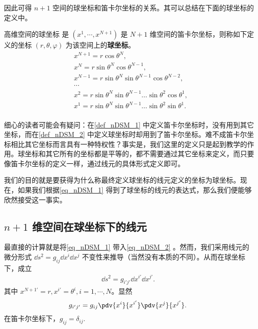 因此可得 $n+1$ 空间的球坐标和笛卡尔坐标的关系。其可以总结在下面的球坐标的定义中。
\begin{definition}{高维空间的球坐标}\label{def_nDSM_2}
是 $(x^1,\cdots,x^{N+1})$ 是 $N+1$ 维空间的笛卡尔坐标，则称如下定义的坐标 $(r,\theta,\varphi)$ 为该空间上的\textbf{球坐标}。
\begin{equation}\label{eq_nDSM_1}
\begin{aligned}
&x^{N+1}=r\cos \theta^N,\\
&x^{N}=r\sin \theta^N\cos\theta^{N-1},\\
&x^{N-1}=r\sin \theta^N\sin\theta^{N-1}\cos\theta^{N-2},\\
&\cdots\\
&x^{2}=r\sin \theta^N\sin\theta^{N-1}\ldots\sin\theta^2\cos\theta^1,\\
&x^{1}=r\sin \theta^N\sin\theta^{N-1}\ldots\sin\theta^2\sin\theta^1.\\
\end{aligned}~
\end{equation}
\end{definition}

细心的读者可能会有疑问：在\autoref{def_nDSM_1} 中定义笛卡尔坐标时，没有用到其它坐标，而在\autoref{def_nDSM_2} 中定义球坐标时却用到了笛卡尔坐标。难不成笛卡尔坐标相比其它坐标而言具有一种特权性？事实是，我们这里的定义只是起到教学的作用。球坐标和其它所有的坐标都是平等的，都不需要通过其它坐标来定义，而只要像笛卡尔坐标的定义一样，通过线元的具体形式定义即可。

我们的目的就是要获得为什么称最终定义球坐标的线元定义的坐标为球坐标。现在，如果我们根据\autoref{eq_nDSM_1} 得到了球坐标的线元的表达式，那么我们便能够欣然接受这一事实。

\subsection{$n+1$ 维空间在球坐标下的线元}
最直接的计算就是将\autoref{eq_nDSM_1} 带入\autoref{eq_nDSM_2} 。然而，我们采用线元的微分形式 $\dd s^2=g_{ij}\dd x^i\dd x^j$ 不变性来推导（当然没有本质的不同）。从而在球坐标下，成立
\begin{equation}
\begin{aligned}
\dd s^2= g_{i'j'}\dd x^{i'}\dd x^{j'}.
\end{aligned}~
\end{equation}
其中 $x^{N+1'}=r,x^{i'}=\theta^i,i=1,\cdots,N$。显然
\begin{equation}\label{eq_nDSM_4}
g_{i'j'}=g_{ij}\pdv{x^i}{x^{i'}}\pdv{x^j}{x^{j'}}.~
\end{equation}
在笛卡尔坐标下，$g_{ij}=\delta_{ij}$.

